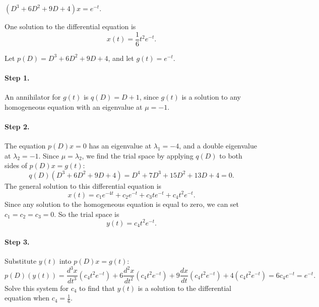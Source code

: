 \documentclass{ximera}
\begin{document}
\begin{exercise}  \label{c12.4.3}
$(D^3+6D^2+9D+4)x = e^{-t}$.

\begin{solution}
\ans One solution to the differential equation is
\[
x(t) = \frac{1}{6}t^2e^{-t}.
\]

\soln Let $p(D) = D^3 + 6D^2 + 9D + 4$, and let $g(t) = e^{-t}$.
\paragraph{Step 1.} An annihilator for $g(t)$ is $q(D) = D + 1$, since
$g(t)$ is a solution to any homogeneous equation with an eigenvalue at
$\mu = -1$.

\paragraph{Step 2.} The equation $p(D)x = 0$ has an eigenvalue at
$\lambda_1 = -4$, and a double eigenvalue at $\lambda_2 = -1$.  Since
$\mu = \lambda_2$, we find the trial space by applying $q(D)$ to both
sides of $p(D)x = g(t)$:
\[
q(D)(D^3 + 6D^2 + 9D + 4) = D^4 + 7D^3 + 15D^2 + 13D + 4 = 0.
\]
The general solution to this differential equation is
\[
x(t) = c_1e^{-4t} + c_2e^{-t} + c_3te^{-t} + c_4t^2e^{-t}.
\]
Since any solution to the homogeneous equation is equal to zero, we can set
$c_1 = c_2 = c_3 = 0$.  So the trial space is
\[
y(t) = c_4t^2e^{-t}.
\]
\paragraph{Step 3.} Substitute $y(t)$ into $p(D)x = g(t)$:
\[
p(D)(y(t)) = \frac{d^3x}{dt^3}(c_4t^2e^{-t}) +
6\frac{d^2x}{dt^2}(c_4t^2e^{-t}) + 9\frac{dx}{dt}(c_4t^2e^{-t}) +
4(c_4t^2e^{-t}) = 6c_4e^{-t} =  e^{-t}.
\]
Solve this system for $c_4$ to find that $y(t)$ is a solution to the
differential equation when $c_4 = \frac{1}{6}$.

\end{solution}
\end{exercise}
\end{document}
